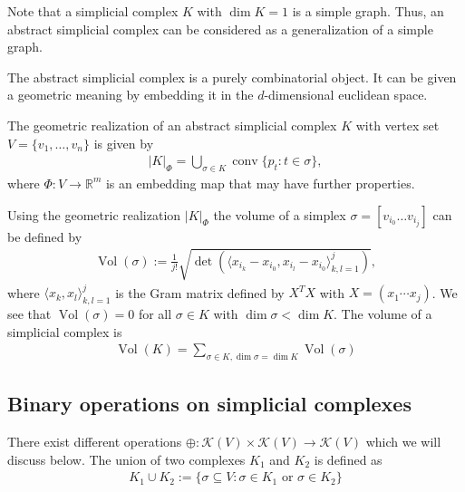 Note that a simplicial complex $K$ with $\dim{K}=1$ is a simple graph. Thus, an abstract simplicial complex can be considered as a generalization of a simple graph.

The abstract simplicial complex is a purely combinatorial object. It can be given a geometric meaning by embedding it in the $d$-dimensional euclidean space.

\begin{Def}
    The geometric realization of an abstract simplicial complex $K$ with vertex set $V=\{v_1,\dots,v_n\}$ is given by
    \begin{align*}
        |K|_{\Phi}=\bigcup\limits_{\sigma\in K}\operatorname{conv}\{p_t:t\in\sigma\},
    \end{align*}
    where $\Phi:V\to\mathbb{R}^m$ is an embedding map that may have further properties.
\end{Def}



Using the geometric realization $|K|_{\Phi}$ the volume of a simplex $\sigma=[v_{i_0}\dots v_{i_j}]$ can be defined by
\begin{align*}
    \operatorname{Vol}(\sigma):= \frac{1}{j!}\sqrt{\det{\left(\langle x_{i_k}-x_{i_0},x_{i_l}-x_{i_0}\rangle_{k,l=1}^{j}\right)}},
\end{align*}
where $\langle x_k,x_l\rangle_{k,l=1}^{j}$ is the Gram matrix defined by $X^TX$ with $X=(x_1\cdots x_j)$. We see that $\operatorname{Vol}(\sigma)=0$ for all $\sigma\in K$ with $\dim{\sigma}<\dim{K}$. The volume of a simplicial complex is
\begin{align*}
    \operatorname{Vol}(K)=\sum_{\sigma\in K,\dim{\sigma}=\dim{K}}\operatorname{Vol}(\sigma)
\end{align*}

\subsection*{Binary operations on simplicial complexes}


There exist different operations $\oplus:\mathcal{K}(V)\times\mathcal{K}(V)\to\mathcal{K}(V)$ which we will discuss below. The union of two complexes $K_1$ and $K_2$ is defined as
\begin{align*}
    K_1\cup K_2:=\{\sigma\subseteq V:\sigma\in K_1\text{ or }\sigma\in K_2\}
\end{align*}


